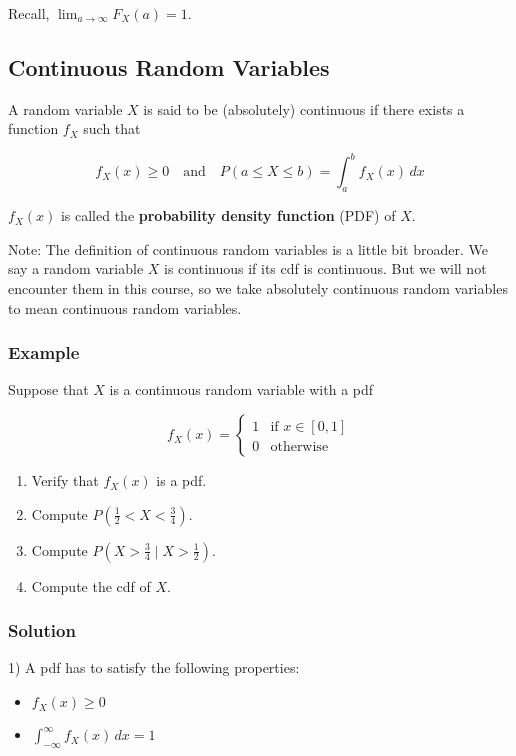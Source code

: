 \documentclass{article}
\begin{document}
    Recall, \(\lim_{a \to \infty} F_X(a) = 1\).

    \subsection*{Continuous Random Variables}

    A random variable \(X\) is said to be (absolutely) continuous if there exists a function \(f_X\) such that 

    \[
        f_X(x) \geq 0 \quad \text{and} \quad P(a \leq X \leq b) = \int_a^b f_X(x) \, dx
    \]

    \(f_X(x)\) is called the \textbf{probability density function} (PDF) of \(X\).

    Note: The definition of continuous random variables is a little bit broader. We say a random variable \(X\) is continuous if its cdf is continuous. But we will not encounter them in this course, so we take absolutely continuous random variables to mean continuous random variables.

    \subsubsection*{Example}

    Suppose that \(X\) is a continuous random variable with a pdf 

    \[
        f_X(x) =
        \begin{cases} 
            1 & \text{if } x \in [0, 1] \\
            0 & \text{otherwise}
        \end{cases}
    \]

    \begin{enumerate}
        \item Verify that \(f_X(x)\) is a pdf.
        \item Compute \(P\left(\frac{1}{2} < X < \frac{3}{4}\right)\).
        \item Compute \(P\left(X > \frac{3}{4} \mid X > \frac{1}{2}\right)\).
        \item Compute the cdf of \(X\).
    \end{enumerate}




    \subsubsection*{Solution}

    1) A pdf has to satisfy the following properties:
    \begin{itemize}
        \item \(f_X(x) \geq 0\)
        \item \(\int_{- \infty}^{\infty} f_X(x) \, dx = 1\)
    \end{itemize}
\end{document}
